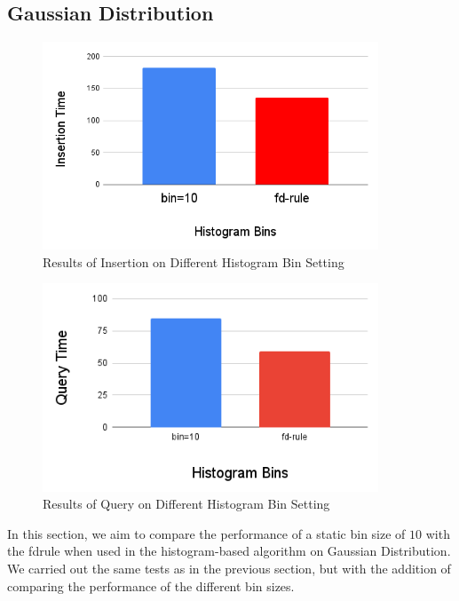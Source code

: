 \subsection{Gaussian Distribution} 
\begin{figure}[H]
    \centering
    \includegraphics[width=100mm,scale=1]{Figures/InsertionHistBin.png}
    \caption{
     Results of Insertion on Different Histogram Bin Setting
    }
    \label{fig:InsertionHistBin}
\end{figure}
\begin{figure}[H]
    \centering
    \includegraphics[width=100mm,scale=1]{Figures/QueryHistBin.png}
    \caption{
     Results of Query on Different Histogram Bin Setting
    }
    \label{fig:QueryHistBin}
\end{figure}
In this section, we aim to compare the performance of a static bin size of $10$ with the \acrshort{fdrule} when used in the histogram-based \learnindex algorithm on Gaussian Distribution. We carried out the same tests as in the previous section, but with the addition of comparing the performance of the different bin sizes.

